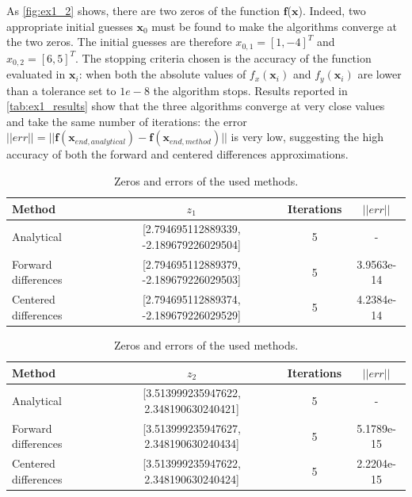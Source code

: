 \documentclass[11pt,a4paper,oneside]{article}
\renewcommand{\vec}[1]{\mathbf{#1}}
\begin{document}
As \autoref{fig:ex1_2} shows, there are two zeros of the function $\vec{f}$($\vec{x}$). 
Indeed, two appropriate initial guesses $\vec{x}_0$ must be found to make the algorithms converge 
at the two zeros. The initial guesses are therefore $x_{0,1}={[1, -4]}^T$ and $x_{0,2}={[6, 5]}^T$. 
The stopping criteria chosen is the accuracy of the function evaluated in $\vec{x}_i$: when both 
the absolute values of $f_x(\vec{x}_i)$ and $f_y(\vec{x}_i)$ are lower than a tolerance set to ${1e-8}$ 
the algorithm stops. Results reported in \autoref{tab:ex1_results} show that the three algorithms 
converge at very close values and take the same number of iterations: the error 
$||err||=||\vec{f}(\vec{x}_{end,analytical}) - \vec{f}(\vec{x}_{end,method})||$ is very low, 
suggesting the high accuracy of both the forward and centered differences approximations.
\begin{table}[ht]
    \centering
    \begin{tabular}{l|c c c}
        \textbf{Method} & \mbox{\boldmath$z_1$} & \textbf{Iterations} &  \mbox{\boldmath$||err||$} \\
        \midrule
        \midrule
        Analytical                  & [2.794695112889339, -2.189679226029504]  & 5 & -\\
        Forward differences         & [2.794695112889379, -2.189679226029503]  & 5 & 3.9563e-14\\
        Centered differences        & [2.794695112889374, -2.189679226029529]  & 5 & 4.2384e-14\\
        \toprule
    \end{tabular}
    \begin{tabular}{l|c c c}
        \textbf{Method} & \mbox{\boldmath$z_2$} & \textbf{Iterations} &  \mbox{\boldmath$||err||$} \\
        \midrule
        \midrule
        Analytical                  & [3.513999235947622, 2.348190630240421]  & 5 & -\\
        Forward differences         & [3.513999235947627, 2.348190630240434]  & 5 & 5.1789e-15\\
        Centered differences        & [3.513999235947622, 2.348190630240424]  & 5 & 2.2204e-15\\
    \end{tabular}
    \caption{Zeros and errors of the used methods.}\label{tab:ex1_results}
\end{table}


\end{document}

